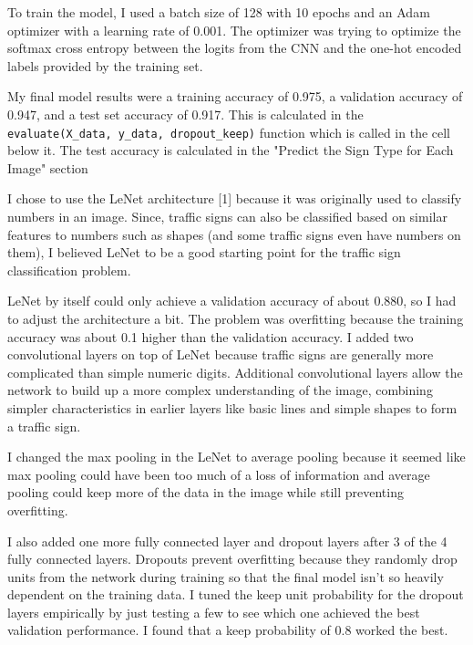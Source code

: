 \documentclass[12pt]{article}
\begin{document}
To train the model, I used a batch size of 128 with 10 epochs and an Adam optimizer with a learning rate of 0.001. The optimizer was trying to optimize the softmax cross entropy between the logits from the CNN and the one-hot encoded labels provided by the training set.

My final model results were a training accuracy of 0.975, a validation accuracy of 0.947, and a test set accuracy of 0.917. This is calculated in the \verb|evaluate(X_data, y_data, dropout_keep)| function which is called in the cell below it. The test accuracy is calculated in the "Predict the Sign Type for Each Image" section

I chose to use the LeNet architecture [1] because it was originally used to classify numbers in an image. Since, traffic signs can also be classified based on similar features to numbers such as shapes (and some traffic signs even have numbers on them), I believed LeNet to be a good starting point for the traffic sign classification problem.

LeNet by itself could only achieve a validation accuracy of about 0.880, so I had to adjust the architecture a bit. The problem was overfitting because the training accuracy was about 0.1 higher than the validation accuracy. I added two convolutional layers on top of LeNet because traffic signs are generally more complicated than simple numeric digits. Additional convolutional layers allow the network to build up a more complex understanding of the image, combining simpler characteristics in earlier layers like basic lines and simple shapes to form a traffic sign. 

I changed the max pooling in the LeNet to average pooling because it seemed like max pooling could have been too much of a loss of information and average pooling could keep more of the data in the image while still preventing overfitting.

I also added one more fully connected layer and dropout layers after 3 of the 4 fully connected layers. Dropouts prevent overfitting because they randomly drop units from the network during training so that the final model isn't so heavily dependent on the training data. I tuned the keep unit probability for the dropout layers empirically by just testing a few to see which one achieved the best validation performance. I found that a keep probability of 0.8 worked the best.
\end{document}
